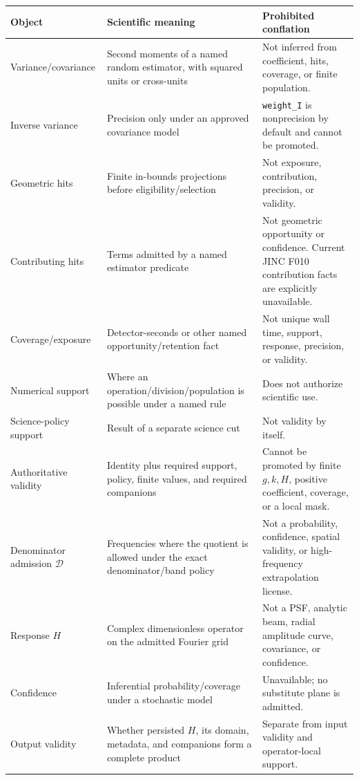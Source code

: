\documentclass[11pt]{article}
\begin{document}
\begin{longtable}{@{}L{0.18\textwidth}L{0.28\textwidth}L{0.45\textwidth}@{}}
\toprule
Object & Scientific meaning & Prohibited conflation \\
\midrule
\endhead
Variance/covariance & Second moments of a named random estimator, with squared
units or cross-units & Not inferred from coefficient, hits, coverage, or finite
population. \\
Inverse variance & Precision only under an approved covariance model &
\texttt{weight\_I} is nonprecision by default and cannot be promoted. \\
Geometric hits & Finite in-bounds projections before eligibility/selection &
Not exposure, contribution, precision, or validity. \\
Contributing hits & Terms admitted by a named estimator predicate & Not
geometric opportunity or confidence.  Current JINC F010 contribution facts are
explicitly unavailable. \\
Coverage/exposure & Detector-seconds or other named opportunity/retention fact
& Not unique wall time, support, response, precision, or validity. \\
Numerical support & Where an operation/division/population is possible under a
named rule & Does not authorize scientific use. \\
Science-policy support & Result of a separate science cut & Not validity by
itself. \\
Authoritative validity & Identity plus required support, policy, finite values,
and required companions & Cannot be promoted by finite $g,k,H$, positive
coefficient, coverage, or a local mask. \\
Denominator admission $\mathcal D$ & Frequencies where the quotient is allowed
under the exact denominator/band policy & Not a probability, confidence,
spatial validity, or high-frequency extrapolation license. \\
Response $H$ & Complex dimensionless operator on the admitted Fourier grid &
Not a PSF, analytic beam, radial amplitude curve, covariance, or confidence. \\
Confidence & Inferential probability/coverage under a stochastic model &
Unavailable; no substitute plane is admitted. \\
Output validity & Whether persisted $H$, its domain, metadata, and companions
form a complete product & Separate from input validity and operator-local
support. \\
\bottomrule
\end{longtable}
\end{document}
